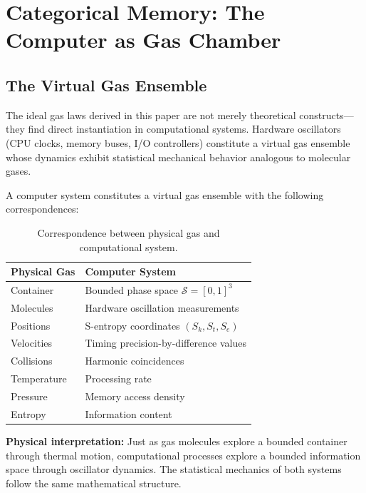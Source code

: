 \section{Categorical Memory: The Computer as Gas Chamber}
\label{sec:categorical_memory}

\subsection{The Virtual Gas Ensemble}

The ideal gas laws derived in this paper are not merely theoretical constructs—they find direct instantiation in computational systems. Hardware oscillators (CPU clocks, memory buses, I/O controllers) constitute a virtual gas ensemble whose dynamics exhibit statistical mechanical behavior analogous to molecular gases.

\begin{proposition}
\label{prop:virtual_gas}
A computer system constitutes a virtual gas ensemble with the following correspondences:
\end{proposition}

\begin{table}[h]
\centering
\begin{tabular}{ll}
\hline
\textbf{Physical Gas} & \textbf{Computer System} \\
\hline
Container & Bounded phase space $\mathcal{S} = [0,1]^3$ \\
Molecules & Hardware oscillation measurements \\
Positions & S-entropy coordinates $(S_k, S_t, S_e)$ \\
Velocities & Timing precision-by-difference values \\
Collisions & Harmonic coincidences \\
Temperature & Processing rate \\
Pressure & Memory access density \\
Entropy & Information content \\
\hline
\end{tabular}
\caption{Correspondence between physical gas and computational system.}
\label{tab:gas_computer_correspondence}
\end{table}

\textbf{Physical interpretation:} Just as gas molecules explore a bounded container through thermal motion, computational processes explore a bounded information space through oscillator dynamics. The statistical mechanics of both systems follow the same mathematical structure.

